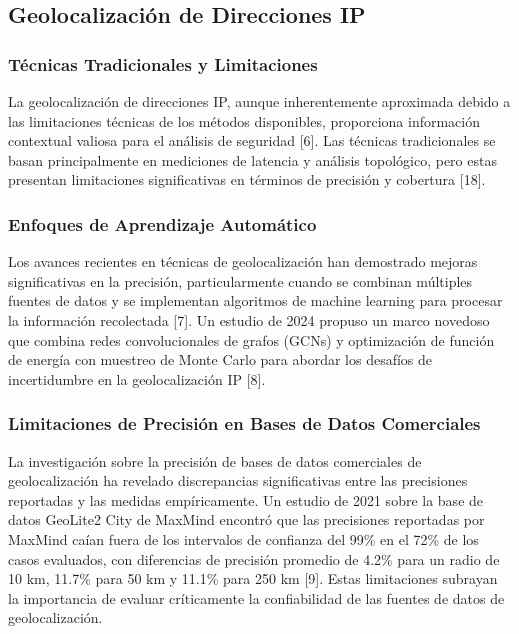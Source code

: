 \subsection{Geolocalización de Direcciones IP}

\subsubsection{Técnicas Tradicionales y Limitaciones}

La geolocalización de direcciones IP, aunque inherentemente aproximada debido a las limitaciones técnicas de los métodos disponibles, proporciona información contextual valiosa para el análisis de seguridad [6]. Las técnicas tradicionales se basan principalmente en mediciones de latencia y análisis topológico, pero estas presentan limitaciones significativas en términos de precisión y cobertura [18].

\subsubsection{Enfoques de Aprendizaje Automático}

Los avances recientes en técnicas de geolocalización han demostrado mejoras significativas en la precisión, particularmente cuando se combinan múltiples fuentes de datos y se implementan algoritmos de machine learning para procesar la información recolectada [7]. Un estudio de 2024 propuso un marco novedoso que combina redes convolucionales de grafos (GCNs) y optimización de función de energía con muestreo de Monte Carlo para abordar los desafíos de incertidumbre en la geolocalización IP [8].

\subsubsection{Limitaciones de Precisión en Bases de Datos Comerciales}

La investigación sobre la precisión de bases de datos comerciales de geolocalización ha revelado discrepancias significativas entre las precisiones reportadas y las medidas empíricamente. Un estudio de 2021 sobre la base de datos GeoLite2 City de MaxMind encontró que las precisiones reportadas por MaxMind caían fuera de los intervalos de confianza del 99\% en el 72\% de los casos evaluados, con diferencias de precisión promedio de 4.2\% para un radio de 10 km, 11.7\% para 50 km y 11.1\% para 250 km [9]. Estas limitaciones subrayan la importancia de evaluar críticamente la confiabilidad de las fuentes de datos de geolocalización.

